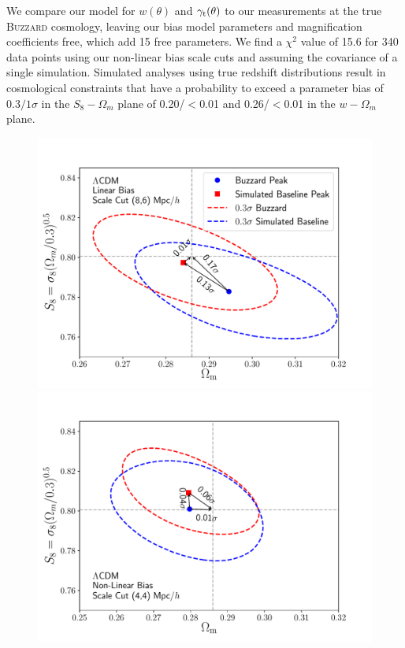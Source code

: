 \documentclass[fleqn,usenatbib]{mnras}
\begin{document}
We compare our model for $w(\theta)$ and $\gamma_{\rm t}(\theta)$ to our measurements at the true \textsc{Buzzard} cosmology, leaving our bias model parameters and magnification coefficients free, which add 15 free parameters. We find a $\chi^2$ value of 15.6 for 340 data points using our non-linear bias scale cuts and assuming the covariance of a single simulation. Simulated analyses using true redshift distributions result in cosmological constraints that have a probability to exceed a parameter bias of $0.3/1\sigma$ in the $S_8-\Omega_{m}$ plane of 0.20/$<$0.01 and 0.26/$<$0.01 in the $w-\Omega_{m}$ plane.


\begin{figure}
\includegraphics[width=\columnwidth]{figs/Buzzard_linbias86_2x2pt_lcdm.pdf}
\includegraphics[width=\columnwidth]{figs/Buzzard_nlbias44_2x2pt_lcdm.pdf}

\end{figure}
\end{document}
